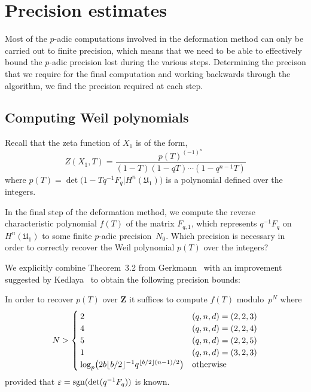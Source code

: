 \section{Precision estimates}

Most of the $p$-adic computations involved in the deformation 
method can only be carried out to finite precision, which means 
that we need to be able to effectively bound the $p$-adic 
precision lost during the various steps.  Determining the precison 
that we require for the final computation and working backwards 
through the algorithm, we find the precision required at 
each step.

\subsection{Computing Weil polynomials}

Recall that the zeta function of $X_1$ is of the form,
\begin{equation*}
Z(X_1,T) = \frac{p(T)^{(-1)^n}}{(1 - T) (1 - qT) \dotsm (1 - q^{n-1}T)}
\end{equation*}
where $p(T) = \det \bigl( 1 - T q^{-1} F_q | H^n(\mathfrak{U}_1) \bigr)$ 
is a polynomial defined over the integers.

In the final step of the deformation method, we compute the 
reverse characteristic polynomial $f(T)$ of the matrix $F_{q,1}$, 
which represents $q^{-1} F_q$ on $H^n(\mathfrak{U}_1)$ to some finite 
$p$-adic precision~$N_0$.  Which precision is necessary in order to 
correctly recover the Weil polynomial $p(T)$ over the integers?

We explicitly combine Theorem~{3.2} from Gerkmann~\citep{Gerkmann2007} 
with an improvement suggested by Kedlaya~\citep[Lemma~1.2.3]{Kedlaya2011}
to obtain the following precision bounds:

\begin{thm}
In order to recover $p(T)$ over $\mathbf{Z}$ it suffices to compute 
$f(T)$ modulo~$p^N$ where 
\begin{equation*}
N > \begin{cases}
    2 & (q,n,d) = (2,2,3) \\
    4 & (q,n,d) = (2,2,4) \\
    5 & (q,n,d) = (2,2,5) \\
    1 & (q,n,d) = (3,2,3) \\
    \log_p \bigl( 2 b \lfloor b/2\rfloor^{-1} q^{\left\lfloor b/2\right\rfloor (n - 1) / 2} \bigr) & \text{otherwise}
    \end{cases}
\end{equation*}
provided that $\varepsilon = \operatorname{sgn}(\det(q^{-1} F_q))$ is known.
\end{thm}

